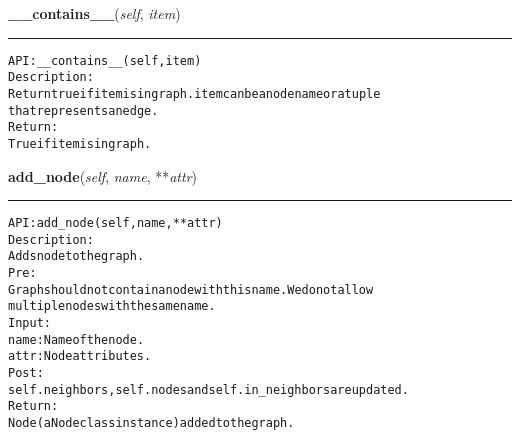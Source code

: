     \label{coinor:gimpy:graph:Graph:__contains__}

    \vspace{0.5ex}

\hspace{.8\funcindent}\begin{boxedminipage}{\funcwidth}

    \raggedright \textbf{\_\_contains\_\_}(\textit{self}, \textit{item})

    \vspace{-1.5ex}

    \rule{\textwidth}{0.5\fboxrule}
\setlength{\parskip}{2ex}
\begin{alltt}

API: \_\_contains\_\_(self, item)
Description:
Return true if item is in graph. item can be a node name or a tuple
that represents an edge.
Return:
    True if item is in graph.
\end{alltt}

\setlength{\parskip}{1ex}
    \end{boxedminipage}

    \label{coinor:gimpy:graph:Graph:add_node}

    \vspace{0.5ex}

\hspace{.8\funcindent}\begin{boxedminipage}{\funcwidth}

    \raggedright \textbf{add\_node}(\textit{self}, \textit{name}, **\textit{attr})

    \vspace{-1.5ex}

    \rule{\textwidth}{0.5\fboxrule}
\setlength{\parskip}{2ex}
\begin{alltt}

API: add\_node(self, name, **attr)
Description:
Adds node to the graph.
Pre:
    Graph should not contain a node with this name. We do not allow
    multiple nodes with the same name.
Input:
    name: Name of the node.
    attr: Node attributes.
Post:
    self.neighbors, self.nodes and self.in\_neighbors are updated.
Return:
    Node (a Node class instance) added to the graph.
\end{alltt}

\setlength{\parskip}{1ex}
    \end{boxedminipage}

